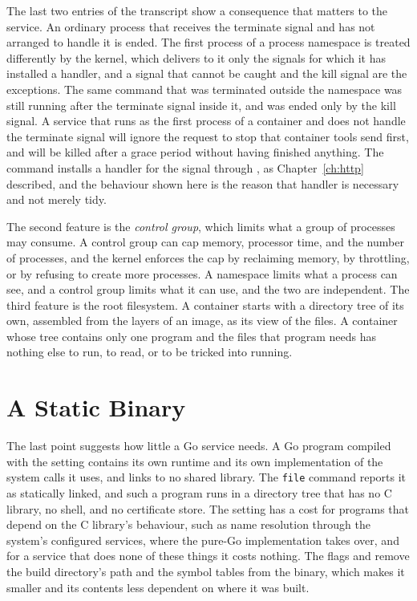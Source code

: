 The last two entries of the transcript show a consequence that matters to the service. An ordinary process that receives the terminate signal and has not arranged to handle it is ended. The first process of a process namespace is treated differently by the kernel, which delivers to it only the signals for which it has installed a handler, and a signal that cannot be caught and the kill signal are the exceptions. The same command that was terminated outside the namespace was still running after the terminate signal inside it, and was ended only by the kill signal. A service that runs as the first process of a container and does not handle the terminate signal will ignore the request to stop that container tools send first, and will be killed after a grace period without having finished anything. The  command installs a handler for the signal through , as Chapter~\ref{ch:http} described, and the behaviour shown here is the reason that handler is necessary and not merely tidy.

The second feature is the \emph{control group}, which limits what a group of processes may consume. A control group can cap memory, processor time, and the number of processes, and the kernel enforces the cap by reclaiming memory, by throttling, or by refusing to create more processes. A namespace limits what a process can see, and a control group limits what it can use, and the two are independent. The third feature is the root filesystem. A container starts with a directory tree of its own, assembled from the layers of an image, as its view of the files. A container whose tree contains only one program and the files that program needs has nothing else to run, to read, or to be tricked into running.

\section{A Static Binary}

The last point suggests how little a Go service needs. A Go program compiled with the  setting contains its own runtime and its own implementation of the system calls it uses, and links to no shared library. The \texttt{file} command reports it as statically linked, and such a program runs in a directory tree that has no C library, no shell, and no certificate store. The setting has a cost for programs that depend on the C library's behaviour, such as name resolution through the system's configured services, where the pure-Go implementation takes over, and for a service that does none of these things it costs nothing. The flags  and  remove the build directory's path and the symbol tables from the binary, which makes it smaller and its contents less dependent on where it was built.

